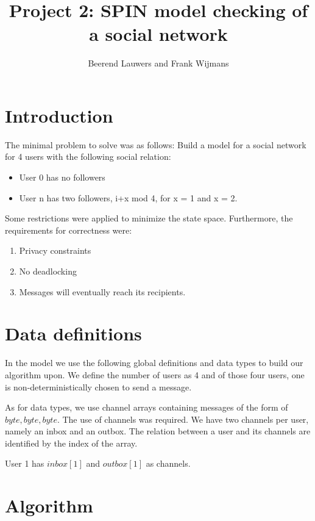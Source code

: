 \documentclass[10pt,a4paper]{article}
\author{Beerend Lauwers and Frank Wijmans}
\title{Project 2: SPIN model checking of a social network}
\begin{document}
	\maketitle
	
	\section{Introduction}
	
	The minimal problem to solve was as follows:
	Build a model for a social network for 4 users with the following social relation:
	\begin{itemize}
		\item User 0 has no followers
		\item User n has two followers, i+x mod 4, for x = 1 and x = 2.
	\end{itemize}
	
	Some restrictions were applied to minimize the state space.
	Furthermore, the requirements for correctness were:
	\begin{enumerate}
		\item Privacy constraints
		\item No deadlocking
		\item Messages will eventually reach its recipients.
	\end{enumerate}
	
	\section{Data definitions}
	In the model we use the following global definitions and data types to build our algorithm upon.
	We define the number of users as 4 and of those four users, one is non-deterministically chosen to send a message.
	
	As for data types, we use channel arrays containing messages of the form of ${byte, byte, byte}$.
	The use of channels was required. 
	We have two channels per user, namely an inbox and an outbox.
	The relation between a user and its channels are identified by the index of the array.
	\begin{center}
		User 1 has $inbox[1]$ and $outbox[1]$ as channels.
	\end{center}
	
	\section{Algorithm}
	
\end{document}
